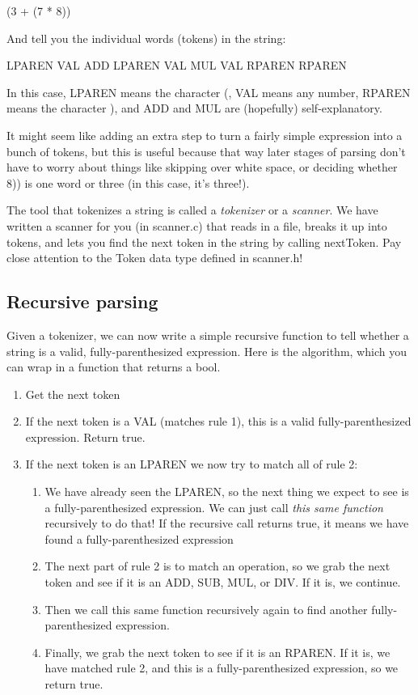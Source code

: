 \documentclass{article}
\begin{document}
\textsf{(3 + (7 * 8))}


And tell you the individual words (tokens) in the string:


\textsf{LPAREN VAL ADD LPAREN VAL MUL VAL RPAREN RPAREN}


In this case, \textsf{LPAREN} means the character \textsf{(}, \textsf{VAL} means any number, \textsf{RPAREN} means the character \textsf{)}, and \textsf{ADD} and \textsf{MUL} are (hopefully) self-explanatory.


    It might seem like adding an extra step to turn a fairly simple expression into a bunch of tokens, but this is useful because that way later stages of parsing don't have to worry about things like skipping over white space, or deciding whether \textsf{8))} is one word or three (in this case, it's three!).


The tool that tokenizes a string is called a {\em tokenizer} or a {\em scanner}. We have written a scanner for you (in \textsf{scanner.c}) that reads in a file, breaks it up into tokens, and lets you find the next token in the string by calling \textsf{nextToken}. Pay close attention to the \textsf{Token} data type defined in \textsf{scanner.h}!

\subsection{Recursive parsing}
Given a tokenizer, we can now write a simple recursive function to tell whether a string is a valid, fully-parenthesized expression. Here is the algorithm, which you can wrap in a function that returns a \textsf{bool}.

\begin{enumerate}
\item    Get the next token
\item    If the next token is a \textsf{VAL} (matches rule 1), this is a valid fully-parenthesized expression. Return \textsf{true}.
\item    If the next token is an \textsf{LPAREN} we now try to match all of rule 2:
\begin{enumerate}
\item        We have already seen the \textsf{LPAREN}, so the next thing we expect to see is a fully-parenthesized expression. We can just call {\em this same function} recursively to do that! If the recursive call returns \textsf{true}, it means we have found a fully-parenthesized expression
\item        The next part of rule 2 is to match an operation, so we grab the next token and see if it is an \textsf{ADD, SUB, MUL,} or \textsf{DIV}. If it is, we continue.
\item        Then we call this same function recursively again to find another fully-parenthesized expression.
\item        Finally, we grab the next token to see if it is an \textsf{RPAREN}. If it is, we have matched rule 2, and this is a fully-parenthesized expression, so we return \textsf{true}.
\end{enumerate}
\end{enumerate}
\end{document}
